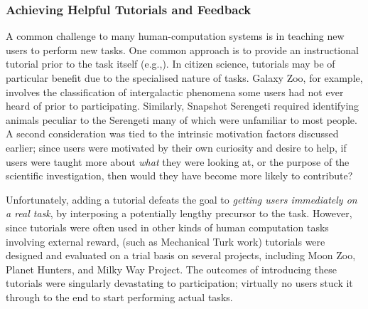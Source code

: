 \documentclass{sigchi}
\begin{document}

\subsubsection{Achieving Helpful Tutorials and Feedback}
A common challenge to many human-computation systems is in teaching new users to perform new tasks. One common approach is to provide an instructional tutorial prior to the task itself (e.g.,\cite{gutheim2012fantasktic}).  In citizen science, tutorials may be of particular benefit due to the specialised nature of tasks. Galaxy Zoo, for example, involves the classification of intergalactic phenomena some users had not ever heard of prior to participating.  Similarly, Snapshot Serengeti required identifying animals peculiar to the Serengeti many of which were unfamiliar to most people.  A second consideration was tied to the intrinsic motivation factors discussed earlier; since users were motivated by their own curiosity and desire to help, if users were taught more about \emph{what} they were looking at, or the purpose of the scientific investigation, then would they have become more likely to contribute?

Unfortunately, adding a tutorial defeats the goal to \emph{getting users immediately on a real task}, by interposing a potentially lengthy precursor to the task.  However, since tutorials were often used in other kinds of human computation tasks involving external reward, (such as Mechanical Turk work) tutorials were designed and evaluated on a trial basis on several projects, including Moon Zoo, Planet Hunters, and Milky Way Project. The outcomes of introducing these tutorials were singularly devastating to participation; virtually no users stuck it through to the end to start performing actual tasks. 

\end{document}
